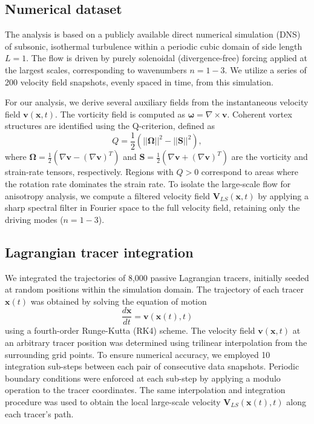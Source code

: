 \documentclass[]{article}
\begin{document}
\subsection{Numerical dataset}
The analysis is based on a publicly available direct numerical simulation (DNS) of subsonic, isothermal turbulence within a periodic cubic domain of side length $L=1$. The flow is driven by purely solenoidal (divergence-free) forcing applied at the largest scales, corresponding to wavenumbers $n=1-3$. We utilize a series of 200 velocity field snapshots, evenly spaced in time, from this simulation.

For our analysis, we derive several auxiliary fields from the instantaneous velocity field $\mathbf{v}(\mathbf{x}, t)$. The vorticity field is computed as $\boldsymbol{\omega} = \nabla \times \mathbf{v}$. Coherent vortex structures are identified using the Q-criterion, defined as
\begin{equation}
Q = \frac{1}{2} \left( ||\boldsymbol{\Omega}||^2 - ||\mathbf{S}||^2 \right),
\end{equation}
where $\boldsymbol{\Omega} = \frac{1}{2}(\nabla\mathbf{v} - (\nabla\mathbf{v})^T)$ and $\mathbf{S} = \frac{1}{2}(\nabla\mathbf{v} + (\nabla\mathbf{v})^T)$ are the vorticity and strain-rate tensors, respectively. Regions with $Q > 0$ correspond to areas where the rotation rate dominates the strain rate. To isolate the large-scale flow for anisotropy analysis, we compute a filtered velocity field $\mathbf{V}_{LS}(\mathbf{x}, t)$ by applying a sharp spectral filter in Fourier space to the full velocity field, retaining only the driving modes ($n=1-3$).

\subsection{Lagrangian tracer integration}
We integrated the trajectories of 8,000 passive Lagrangian tracers, initially seeded at random positions within the simulation domain. The trajectory of each tracer $\mathbf{x}(t)$ was obtained by solving the equation of motion
\begin{equation}
\frac{d\mathbf{x}}{dt} = \mathbf{v}(\mathbf{x}(t), t)
\end{equation}
using a fourth-order Runge-Kutta (RK4) scheme. The velocity field $\mathbf{v}(\mathbf{x}, t)$ at an arbitrary tracer position was determined using trilinear interpolation from the surrounding grid points. To ensure numerical accuracy, we employed 10 integration sub-steps between each pair of consecutive data snapshots. Periodic boundary conditions were enforced at each sub-step by applying a modulo operation to the tracer coordinates. The same interpolation and integration procedure was used to obtain the local large-scale velocity $\mathbf{V}_{LS}(\mathbf{x}(t), t)$ along each tracer's path.
\end{document}
